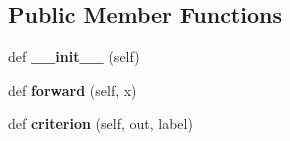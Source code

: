 \subsection*{Public Member Functions}
\begin{DoxyCompactItemize}
\item 
\mbox{\label{classgr__ml_1_1gr__safety_1_1nn__model_1_1NetworkModel_a7c0187f2a14def20a4ba7f24ff748e07}} 
def {\bfseries \+\_\+\+\_\+init\+\_\+\+\_\+} (self)
\item 
\mbox{\label{classgr__ml_1_1gr__safety_1_1nn__model_1_1NetworkModel_a6b2e6393342f2e95bfa2f43117830237}} 
def {\bfseries forward} (self, x)
\item 
\mbox{\label{classgr__ml_1_1gr__safety_1_1nn__model_1_1NetworkModel_a346c5f1af09824a0b4fe0c9badb155ce}} 
def {\bfseries criterion} (self, out, label)
\end{DoxyCompactItemize}
